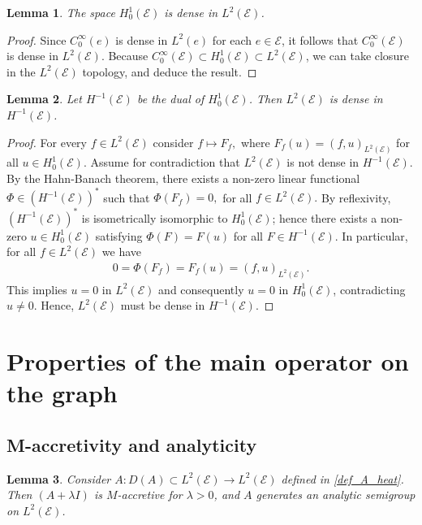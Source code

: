 \documentclass[10pt,a4paper]{amsart}
\def\to{\rightarrow}
\newtheorem{lemma}{Lemma}[section]
\begin{document}
\begin{lemma}\label{lemma:dense_H1L2}
The space $H_0^1(\mathcal{E})$ is dense in $L^2(\mathcal{E})$.
\end{lemma}

\begin{proof}
Since $C_0^\infty(e)$ is dense in $L^2(e)$ for each $e \in \mathcal{E}$, it follows that $C_0^\infty(\mathcal{E})$ is dense in $L^2(\mathcal{E})$. Because $C_0^\infty(\mathcal{E}) \subset H_0^1(\mathcal{E}) \subset L^2(\mathcal{E})$, we can take closure in the $L^2(\mathcal{E})$ topology, and deduce the result.
\end{proof}
\begin{lemma}\label{lemma:dense_L2H-1}
Let $H^{-1}(\mathcal{E})$ be the dual of $H_0^1(\mathcal{E})$. Then $L^2(\mathcal{E})$ is dense in $H^{-1}(\mathcal{E})$.
\end{lemma}

\begin{proof}
For every $f\in L^2(\mathcal{E})$ consider $f \mapsto F_f,$ where $F_f(u) = (f, u)_{L^2(\mathcal{E})}$ for all $u \in H_0^1(\mathcal{E}).$ Assume for contradiction that $ L^2(\mathcal{E}) $ is not dense in $ H^{-1}(\mathcal{E}) $. By the Hahn-Banach theorem, there exists a non-zero linear functional $ \Phi \in (H^{-1}(\mathcal{E}))^*$ such that $\Phi(F_f) = 0,$ for all $f \in L^2(\mathcal{E}).$ By reflexivity, $(H^{-1}(\mathcal{E}))^*$ is isometrically isomorphic to $ H_0^1(\mathcal{E})$; hence there exists a non-zero $u\in H_0^1(\mathcal{E})$ satisfying $\Phi(F) = F(u)$ for all $F \in H^{-1}(\mathcal{E}).$ In particular, for all $ f \in L^2(\mathcal{E}) $ we have
\begin{align*}
    0 = \Phi(F_f) = F_f(u) = (f, u)_{L^2(\mathcal{E})}.
\end{align*}
This implies $u =0 $ in $ L^2(\mathcal{E})$ and consequently $u =0 $ in $ H_0^1(\mathcal{E})$, contradicting $u \neq 0$. Hence, $L^2(\mathcal{E})$ must be dense in $H^{-1}(\mathcal{E}) $.
\end{proof}

 



 \section{Properties of the main operator on the graph}\label{appendix3}



\subsection{M-accretivity  and analyticity}
\begin{lemma}\label{prop:A_deg_generator}
Consider
$A : D(A) \subset L^2(\mathcal{E}) \to L^2(\mathcal{E})$ defined in \eqref{def_A_heat}. Then $(A+\lambda I)$ is $M$-accretive for $\lambda>0$, and $A$ generates an analytic semigroup 
on $L^2(\mathcal{E})$.
\end{lemma}
\end{document}
